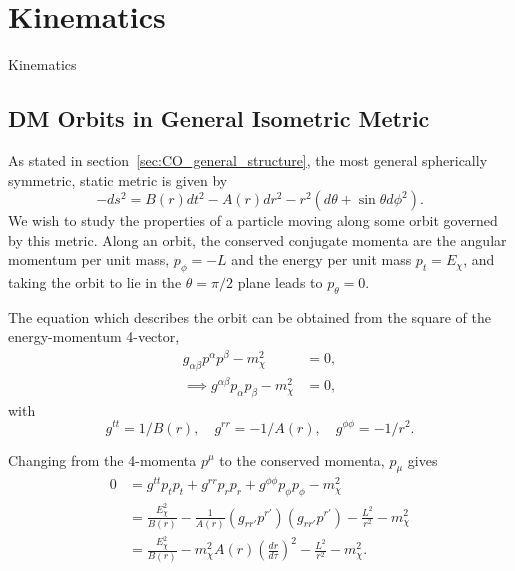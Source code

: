 \graphicspath{{img/appendix_kinematics/}}
\chapter{Kinematics}
\label{appendix:kinematics}



\begin{synopsis}
  Kinematics
\end{synopsis}

\section{DM Orbits in General Isometric Metric}
\label{sec:DM_orbits}

As stated in section~\ref{sec:CO_general_structure}, the most general spherically symmetric, static metric is given by
\begin{equation}
    -ds^2 = B(r) dt^2 - A(r) dr^2 - r^2( d\theta + \sin\theta d\phi^2).
\end{equation}
We wish to study the properties of a particle moving along some orbit governed by this metric. 
Along an orbit, the conserved conjugate momenta are the angular momentum per unit mass, $p_\phi = -L$ 
and the energy per unit mass $p_t = E_\chi$, and taking the orbit to lie in the $\theta = \pi/2$ plane 
leads to $p_\theta = 0$. 

The equation which describes the orbit can be obtained from the square of the energy-momentum 4-vector,
\begin{align}
    g_{\alpha\beta} p^\alpha p^\beta - m_\chi^2 & = 0,\\
    \implies g^{\alpha\beta} p_\alpha p_\beta - m_\chi^2 & = 0,
\end{align}
with
\begin{equation}    
g^{tt} = 1/B(r),\quad g^{rr} = -1/A(r),\quad g^{\phi \phi} = -1/r^2.
\end{equation}

Changing from the 4-momenta $p^\mu$ to the conserved momenta, $p_\mu$ gives
\begin{align}
    0 & = g^{tt} p_t p_t + g^{rr} p_r p_r + g^{\phi\phi} p_\phi p_\phi - m_\chi^2 \\
    & = \frac{E_\chi^2}{B(r)} - \frac{1}{A(r)} \left( g_{rr'} p^{r'} \right)\left( g_{rr'} p^{r'} \right) - \frac{L^2}{r^2} - m_\chi^2 \\
    & = \frac{E_\chi^2}{B(r)} - m_\chi^2 A(r) \left( \frac{dr}{d\tau} \right)^2 - \frac{L^2}{r^2} - m_\chi^2.
\end{align}

